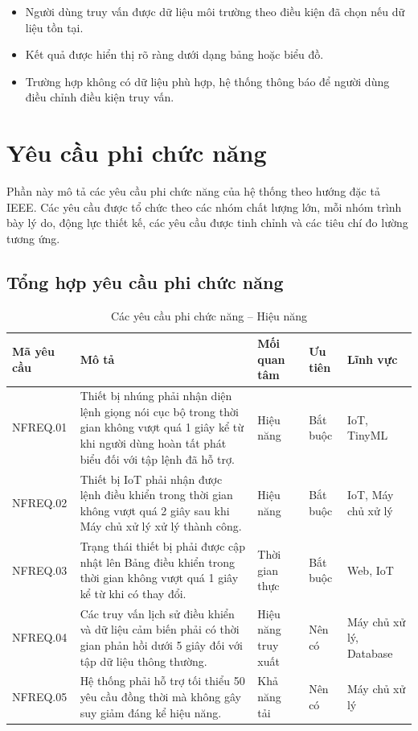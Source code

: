 \documentclass[a4paper,12pt]{article}
\begin{document}
\begin{itemize}
    \item Người dùng truy vấn được dữ liệu môi trường theo điều kiện đã chọn nếu dữ liệu tồn tại.
    \item Kết quả được hiển thị rõ ràng dưới dạng bảng hoặc biểu đồ.
    \item Trường hợp không có dữ liệu phù hợp, hệ thống thông báo để người dùng điều chỉnh điều kiện truy vấn.
\end{itemize}


\section{Yêu cầu phi chức năng}

Phần này mô tả các yêu cầu phi chức năng của hệ thống theo hướng đặc tả IEEE. Các yêu cầu được tổ chức theo các nhóm chất lượng lớn, mỗi nhóm trình bày lý do, động lực thiết kế, các yêu cầu được tinh chỉnh và các tiêu chí đo lường tương ứng.

\subsection{Tổng hợp yêu cầu phi chức năng}


\renewcommand{\arraystretch}{1.3}

\begin{table}[H]
\centering
\caption{Các yêu cầu phi chức năng -- Hiệu năng}\small
\begin{tabularx}{\linewidth}{|p{1.8cm}|X|p{2.5cm}|p{1.7cm}|p{2.1cm}|}
\hline
\textbf{Mã yêu cầu} & \textbf{Mô tả} & \textbf{Mối quan tâm} & \textbf{Ưu tiên} & \textbf{Lĩnh vực}\\
\hline
NFREQ.01 & Thiết bị nhúng phải nhận diện lệnh giọng nói cục bộ trong thời gian không vượt quá 1 giây kể từ khi người dùng hoàn tất phát biểu đối với tập lệnh đã hỗ trợ. & Hiệu năng & Bắt buộc & IoT, TinyML\\
\hline
NFREQ.02 & Thiết bị IoT phải nhận được lệnh điều khiển trong thời gian không vượt quá 2 giây sau khi Máy chủ xử lý xử lý thành công. & Hiệu năng & Bắt buộc & IoT, Máy chủ xử lý\\
\hline
NFREQ.03 & Trạng thái thiết bị phải được cập nhật lên Bảng điều khiển trong thời gian không vượt quá 1 giây kể từ khi có thay đổi. & Thời gian thực & Bắt buộc & Web, IoT\\
\hline
NFREQ.04 & Các truy vấn lịch sử điều khiển và dữ liệu cảm biến phải có thời gian phản hồi dưới 5 giây đối với tập dữ liệu thông thường. & Hiệu năng truy xuất & Nên có & Máy chủ xử lý, Database\\
\hline
NFREQ.05 & Hệ thống phải hỗ trợ tối thiểu 50 yêu cầu đồng thời mà không gây suy giảm đáng kể hiệu năng. & Khả năng tải & Nên có & Máy chủ xử lý\\
\hline
\end{tabularx}
\end{table}
\end{document}
